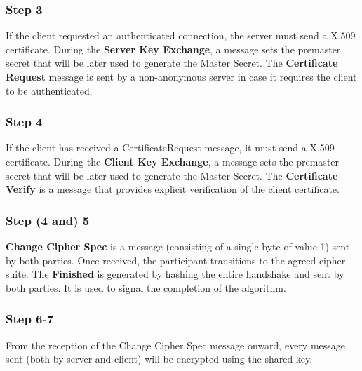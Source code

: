 \documentclass[a4paper, 10pt, titlepage]{article}
\begin{document}
\subsubsection*{Step 3}
If the client requested an authenticated connection, the server must
send a X.509 certificate. 
During the \textbf{Server Key Exchange}, a message sets the premaster secret that will be later used to generate the Master Secret. 
The \textbf{Certificate Request} message is sent by a non-anonymous server in case it requires the client to be authenticated.
\subsubsection*{Step 4}
If the client has received a CertificateRequest message, it must send a X.509 certificate. 
During the \textbf{Client Key Exchange}, a message sets the premaster secret that will be later used to generate the Master Secret.
The \textbf{Certificate Verify} is a message that provides explicit verification of the client certificate.
\subsubsection*{Step (4 and) 5}
\textbf{Change Cipher Spec} is a message (consisting of a single byte of value 1) sent by both parties. Once received, the participant transitions to the agreed cipher suite.
The \textbf{Finished} is generated by hashing the entire handshake and sent by both parties. It is used to signal the completion of the
algorithm.
\subsubsection*{Step 6-7}
From the reception of the Change Cipher Spec message onward, every message sent (both by server and client) will be encrypted using the shared key.

\newpage
\end{document}
